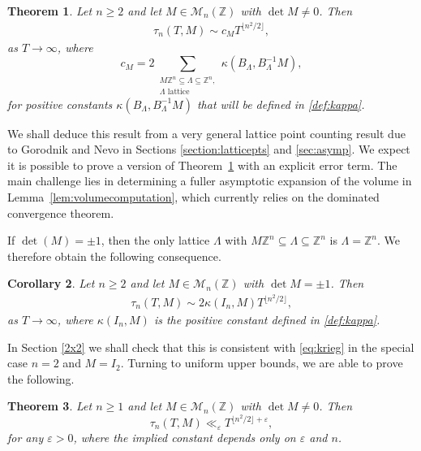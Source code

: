 \documentclass[11pt,reqno]{amsart}
\newtheorem{thm}{Theorem}
\newtheorem{cor}[thm]{Corollary}
\theoremstyle{definition}
\theoremstyle{remark}
\numberwithin{equation}{section}
\numberwithin{thm}{section}
\numberwithin{table}{section}
\def\cM{{\mathcal M}}
\def \Z {{\mathbb Z}}
\newcommand{\eps}{\varepsilon}
\begin{document}
\begin{thm}\label{thm:asymptotic_formula}
    Let $n \ge 2$ and let  $M \in \mathcal{M}_{n}(\Z)$ with $\det M \neq 0$. Then
    \begin{align*}
        \tau_n(T,M) \sim c_{M} T^{\lfloor n^2/2 \rfloor} ,
    \end{align*}
as $T\to \infty$, 
    where
    \[
    c_{M} = 2
    \sum_{
    \substack{
    M \Z^n \subseteq \mathsf{\Lambda} \subseteq \Z^n, \\
    \mathsf{\Lambda} \text{ lattice }
    }
    }
    \kappa (B_{\mathsf\Lambda}, B_{\mathsf\Lambda}^{-1}M),
    \] 
    for positive constants 
  $ \kappa (B_{\mathsf\Lambda}, B_{\mathsf\Lambda}^{-1}M)$ that will be defined in \eqref{def:kappa}.
\end{thm}


We shall deduce this result  from a very general lattice point counting result due to Gorodnik and Nevo \cite{gorodnik_nevo} in Sections \ref{section:latticepts} and \ref{sec:asymp}. 
    We expect it is possible to prove a version of Theorem~\ref{thm:asymptotic_formula} with an explicit error term. The main challenge lies in determining a fuller asymptotic expansion of the volume in Lemma~\ref{lem:volumecomputation}, which currently relies on the dominated convergence theorem.

If $\det(M) = \pm 1$, then the only lattice $\mathsf{\Lambda}$ with $M \Z^n \subseteq \mathsf{\Lambda} \subseteq \Z^n$ is $\mathsf{\Lambda} = \Z^n$. 
We therefore obtain the following consequence.

\begin{cor}\label{cor1.3}
    Let $n \ge 2$ and let  $M \in \mathcal{M}_{n}(\Z)$ with $\det M =\pm 1$. Then
    \begin{align*}
        \tau_n(T,M) \sim 
        2   \kappa (I_n, M)
        T^{\lfloor n^2/2 \rfloor} ,
    \end{align*}
    as $T\to \infty$, where  $\kappa(I_n,M)$ is the positive constant defined in \eqref{def:kappa}.
\end{cor}

In Section \ref{2x2} we shall check that this is consistent with \eqref{eq:krieg} in the special case $n=2$ and $M=I_2$.
Turning to uniform upper bounds, 
we are able to prove the following.

\begin{thm}\label{thm:uniform}
Let $n\geq 1$ and let $M\in \cM_n(\Z)$ with $\det M \neq 0$.  Then  
    \[
        \tau_n(T,M) \ll_{\varepsilon} T^{ \lfloor n^2/2 \rfloor +\varepsilon}, 
    \]
for any $\eps>0$, 
where the implied constant depends only on $\varepsilon$ and $n$.
\end{thm}
\end{document}
